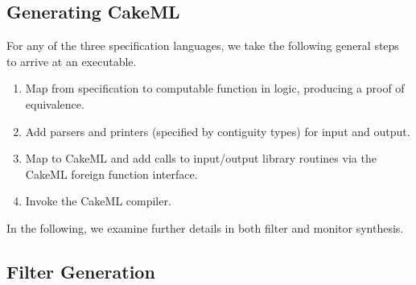 

\subsection{Generating CakeML}
For any of the three specification languages, we take the following general steps to
arrive at an executable.

\begin{enumerate}
\item Map from specification to computable function in logic, producing
a proof of equivalence.
\item Add parsers and printers (specified by contiguity types) for input and output.
\item Map to CakeML and add calls to input/output library routines via
      the CakeML foreign function interface.
\item Invoke the CakeML compiler.
\end{enumerate}


In the following, we examine further details in both filter and
monitor synthesis.

\subsection{Filter Generation}


